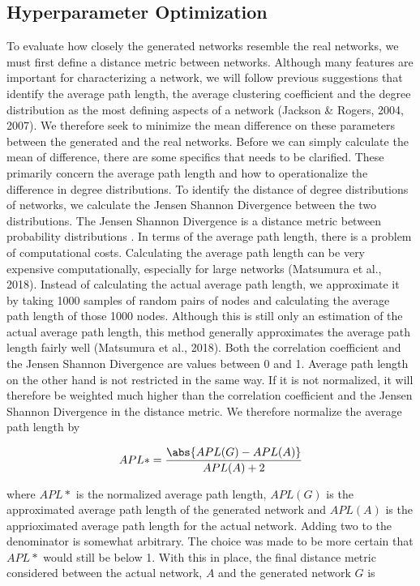 \documentclass{article}
\DeclarePairedDelimiter{\abs}\lvert\rvert
\begin{document}
\subsection{Hyperparameter Optimization}
To evaluate how closely the generated networks resemble the real networks, we must first define a distance metric between networks. Although many features are important for characterizing a network, we will follow previous suggestions that identify the average path length, the average clustering coefficient and the degree distribution as the most defining aspects of a network (Jackson \& Rogers, 2004, 2007). We therefore seek to minimize the mean difference on these parameters between the generated and the real networks. 
Before we can simply calculate the mean of difference, there are some specifics that needs to be clarified. These primarily concern the average path length and how to operationalize the difference in degree distributions. 
To identify the distance of degree distributions of networks, we calculate the Jensen Shannon Divergence between the two distributions. The Jensen Shannon Divergence is a distance metric between probability distributions \cite{fuglede_jensen-shannon_2004}. 
In terms of the average path length, there is a problem of computational costs. Calculating the average path length can be very expensive computationally, especially for large networks (Matsumura et al., 2018). Instead of calculating the actual average path length, we approximate it by taking 1000 samples of random pairs of nodes and calculating the average path length of those 1000 nodes. Although this is still only an estimation of the actual average path length, this method generally approximates the average path length fairly well (Matsumura et al., 2018).
Both the correlation coefficient and the Jensen Shannon Divergence are values between 0 and 1. Average path length on the other hand is not restricted in the same way. If it is not normalized, it will therefore be weighted much higher than the correlation coefficient and the Jensen Shannon Divergence in the distance metric. We therefore normalize the average path length by

$$APL* = \frac{\abs{APL(G) - APL(A)}}{APL(A)+2}$$

where $APL*$ is the normalized average path length, $APL(G)$ is the approximated average path length of the generated network and $APL(A)$ is the apprioximated average path length for the actual network. Adding two to the denominator is somewhat arbitrary. The choice was made to be more certain that $APL*$ would still be below 1.
With this in place, the final distance metric considered between the actual network, $A$ and the generated network $G$ is 
\end{document}

